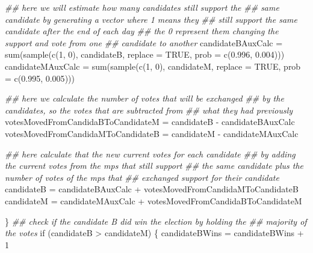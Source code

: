 \documentclass[
  a4paper,
  DIV=11,
  numbers=noendperiod]{scrartcl}
\newenvironment{Shaded}{\begin{snugshade}}{\end{snugshade}}
\newcommand{\AttributeTok}[1]{\textcolor[rgb]{0.40,0.45,0.13}{#1}}
\newcommand{\ConstantTok}[1]{\textcolor[rgb]{0.56,0.35,0.01}{#1}}
\newcommand{\ControlFlowTok}[1]{\textcolor[rgb]{0.00,0.23,0.31}{#1}}
\newcommand{\DecValTok}[1]{\textcolor[rgb]{0.68,0.00,0.00}{#1}}
\newcommand{\DocumentationTok}[1]{\textcolor[rgb]{0.37,0.37,0.37}{\textit{#1}}}
\newcommand{\FloatTok}[1]{\textcolor[rgb]{0.68,0.00,0.00}{#1}}
\newcommand{\FunctionTok}[1]{\textcolor[rgb]{0.28,0.35,0.67}{#1}}
\newcommand{\NormalTok}[1]{\textcolor[rgb]{0.00,0.23,0.31}{#1}}
\newcommand{\OtherTok}[1]{\textcolor[rgb]{0.00,0.23,0.31}{#1}}
\newcommand{\SpecialCharTok}[1]{\textcolor[rgb]{0.37,0.37,0.37}{#1}}
\begin{document}
\begin{Shaded}
\begin{Highlighting}[]
        \DocumentationTok{\#\# here we will estimate how many candidates still support the}
        \DocumentationTok{\#\# same candidate by generating a vector where 1 means they}
        \DocumentationTok{\#\# still support the same candidate after the end of each day}
        \DocumentationTok{\#\# the 0 represent them changing the support and vote from one}
        \DocumentationTok{\#\# candidate to another}
\NormalTok{        candidateBAuxCalc }\OtherTok{=} \FunctionTok{sum}\NormalTok{(}\FunctionTok{sample}\NormalTok{(}\FunctionTok{c}\NormalTok{(}\DecValTok{1}\NormalTok{, }\DecValTok{0}\NormalTok{), candidateB, }\AttributeTok{replace =} \ConstantTok{TRUE}\NormalTok{,}
            \AttributeTok{prob =} \FunctionTok{c}\NormalTok{(}\FloatTok{0.996}\NormalTok{, }\FloatTok{0.004}\NormalTok{)))}
\NormalTok{        candidateMAuxCalc }\OtherTok{=} \FunctionTok{sum}\NormalTok{(}\FunctionTok{sample}\NormalTok{(}\FunctionTok{c}\NormalTok{(}\DecValTok{1}\NormalTok{, }\DecValTok{0}\NormalTok{), candidateM, }\AttributeTok{replace =} \ConstantTok{TRUE}\NormalTok{,}
            \AttributeTok{prob =} \FunctionTok{c}\NormalTok{(}\FloatTok{0.995}\NormalTok{, }\FloatTok{0.005}\NormalTok{)))}

        \DocumentationTok{\#\# here we calculate the number of votes that will be exchanged}
        \DocumentationTok{\#\# by the candidates, so the votes that are subtracted from}
        \DocumentationTok{\#\# what they had previously}
\NormalTok{        votesMovedFromCandidaBToCandidateM }\OtherTok{=}\NormalTok{ candidateB }\SpecialCharTok{{-}}\NormalTok{ candidateBAuxCalc}
\NormalTok{        votesMovedFromCandidaMToCandidateB }\OtherTok{=}\NormalTok{ candidateM }\SpecialCharTok{{-}}\NormalTok{ candidateMAuxCalc}

        \DocumentationTok{\#\# here calculate that the new current votes for each candidate}
        \DocumentationTok{\#\# by adding the current votes from the mps that still support}
        \DocumentationTok{\#\# the same candidate plus the number of votes of the mps that}
        \DocumentationTok{\#\# exchanged support for their candidate}
\NormalTok{        candidateB }\OtherTok{=}\NormalTok{ candidateBAuxCalc }\SpecialCharTok{+}\NormalTok{ votesMovedFromCandidaMToCandidateB}
\NormalTok{        candidateM }\OtherTok{=}\NormalTok{ candidateMAuxCalc }\SpecialCharTok{+}\NormalTok{ votesMovedFromCandidaBToCandidateM}

\NormalTok{    \}}
    \DocumentationTok{\#\# check if the candidate B did win the election by holding the}
    \DocumentationTok{\#\# majority of the votes}
    \ControlFlowTok{if}\NormalTok{ (candidateB }\SpecialCharTok{\textgreater{}}\NormalTok{ candidateM) \{}
\NormalTok{        candidateBWins }\OtherTok{=}\NormalTok{ candidateBWins }\SpecialCharTok{+} \DecValTok{1}


\end{Highlighting}
\end{Shaded}
\end{document}
